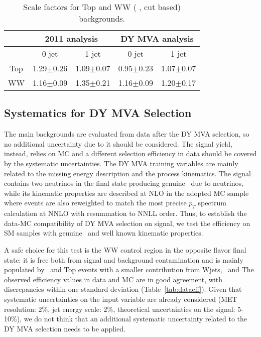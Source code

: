 \begin{table}[!ht]
\begin{center}
\begin{tabular} {|c|cc|cc|}
\hline
 & \multicolumn{2}{|c|}{2011 analysis} & \multicolumn{2}{|c|}{DY MVA analysis}\\
\hline
    & 0-jet & 1-jet & 0-jet & 1-jet \\
Top & 1.29$\pm$0.26 & 1.09$\pm$0.07 & 0.95$\pm$0.23 & 1.07$\pm$0.07 \\
WW  & 1.16$\pm$0.09 & 1.35$\pm$0.21 & 1.16$\pm$0.09 & 1.20$\pm$0.17 \\
\hline
\end{tabular}
\caption{Scale factors for Top and WW ( \GeVcc, cut based) backgrounds.}
\label{tab:sftopww}
\end{center}
\end{table}

\subsection{Systematics for DY MVA Selection}

The main backgrounds are evaluated from data after the DY MVA selection, so no additional uncertainty due to it should be considered.
The signal yield, instead, relies on MC and a different selection efficiency in data should be covered by the systematic uncertainties.
The DY MVA training variables are mainly related to the missing energy description and the process kinematics. 
The signal contains two neutrinos in the final state producing genuine \met\ due to neutrinos, while its kinematic properties are described at NLO in the adopted MC sample
where events are also reweighted to match the most precise $p_T$ spectrum calculation at NNLO with resummation to NNLL order.
Thus, to establish the data-MC compatibility of DY MVA selection on signal, we test the efficiency on SM samples with genuine \met\ and well known kinematic properties.

A safe choice for this test is the WW control region in the opposite flavor final state: it is free both from signal and background contamination and is mainly
populated by \W\W\ and Top events with a smaller contribution from Wjets, \W\Z\ and \Z\Z\. 
The observed efficiency values in data and MC are in good agreement, with discrepancies within one standard deviation (Table~\ref{tab:dataeff}).
Given that systematic uncertainties on the input variable are already considered (MET resolution: 2\%, jet energy scale: 2\%, theoretical uncertainties on the signal: 5-10\%),
we do not think that an additional systematic uncertainty related to the DY MVA selection needs to be applied.

